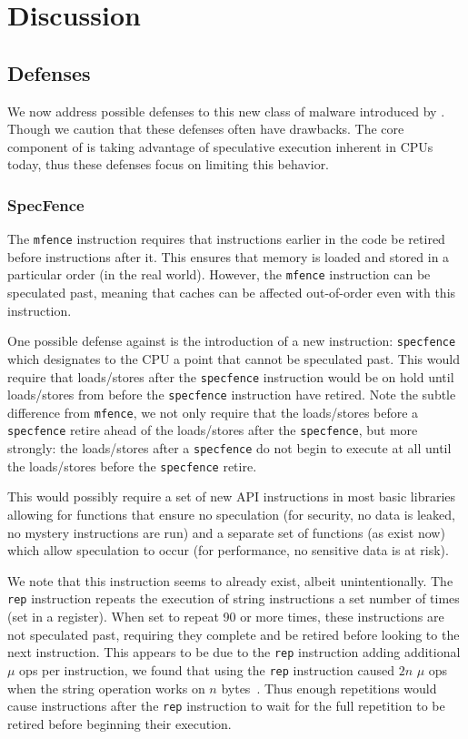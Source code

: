
\section{Discussion}

\subsection{Defenses}
We now address possible defenses to this new class of malware introduced by
\speculake. Though we caution that these defenses often have drawbacks. The core
component of \speculake is taking advantage of speculative execution inherent in
CPUs today, thus these defenses focus on limiting this behavior.

\subsubsection{SpecFence}
The \texttt{mfence} instruction requires that instructions earlier in the code
be retired before instructions after it. This ensures that memory is loaded and
stored in a particular order (in the real world). However, the \texttt{mfence}
instruction can be speculated past, meaning that caches can be affected
out-of-order even with this instruction.

One possible defense against \speculake is the introduction of a new
instruction: \texttt{specfence} which designates to the CPU a point that cannot 
be speculated past. This would require that loads/stores after the 
\texttt{specfence} instruction would be on hold until loads/stores from before
the \texttt{specfence} instruction have retired. Note the subtle difference from
\texttt{mfence}, we not only require that the loads/stores before a
\texttt{specfence} retire ahead of the loads/stores after the 
\texttt{specfence}, but more strongly: the loads/stores after a 
\texttt{specfence} do not begin to execute at all until the loads/stores before
the \texttt{specfence} retire.

This would possibly require a set of new API instructions in most basic
libraries allowing for functions that ensure no speculation (for security, no
data is leaked, no mystery instructions are run) and a separate set of functions
(as exist now) which allow speculation to occur (for performance, no sensitive
data is at risk).

We note that this instruction seems to already exist, albeit unintentionally.
The \texttt{rep} instruction repeats the execution of string instructions a set
number of times (set in a register). When set to repeat 90 or more times, these
instructions are not speculated past, requiring they complete and be retired
before looking to the next instruction. This appears to be due to the 
\texttt{rep} instruction adding additional $\mu$ ops per instruction, we found
that using the \texttt{rep} instruction caused $2n$ $\mu$ ops when the string
operation works on $n$ bytes~\cite{uop_article}. Thus enough repetitions would cause instructions
after the \texttt{rep} instruction to wait for the full repetition to be retired
before beginning their execution.

